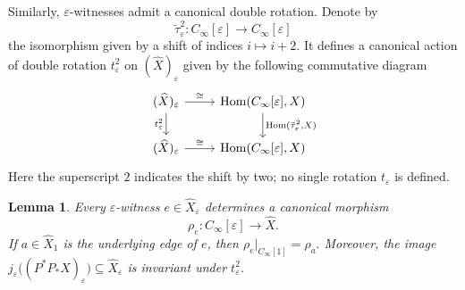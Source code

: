 \documentclass{article}
\theoremstyle{plain}
\newtheorem{lemma}[theorem]{Lemma}
\theoremstyle{definition}
\theoremstyle{remark}
\begin{document}
Similarly, \(\varepsilon\)-witnesses admit a canonical double rotation.
Denote by $$\tilde{\tau}^2_\varepsilon\colon C_\infty[\varepsilon]\rightarrow C_\infty[\varepsilon]$$ the isomorphism given by a shift of indices $i\mapsto i+2$.
It defines a canonical action of double rotation $t^2_\varepsilon$ on $(\widehat{X})_\varepsilon$ given by the following commutative diagram
\begin{equation}\label{diag:canonicalEpsRot}
    \begin{tikzcd}
        (\widehat{X})_\varepsilon\arrow[r,"\cong"]\arrow[d,"{t_\varepsilon^2}"']&\mathrm{Hom}(C_\infty[\varepsilon],X)\arrow[d,"{\mathrm{Hom}(\tilde{\tau}^2_\varepsilon,X)}"]\\
        (\widehat{X})_\varepsilon\arrow[r,"\cong"]&\mathrm{Hom}(C_\infty[\varepsilon],X)
    \end{tikzcd}
\end{equation}
Here the superscript $2$ indicates the shift by two; no single rotation $t_\varepsilon$ is defined.
\begin{lemma}\label{lem:canonicalOrbitsEps}
   Every \(\varepsilon\)-witness
    \(e\in\widehat X_\varepsilon\) determines a canonical morphism
    \[
        \rho_e\colon C_\infty[\varepsilon]\longrightarrow\widehat X.
    \]
    If \(a\in\widehat X_1\) is the underlying edge of \(e\), then
    \(
        \rho_e|_{C_\infty[1]}=\rho_a.
    \)
    Moreover, the image
\(
    j_\varepsilon\bigl((P^*P_*X)_\varepsilon\bigr)
    \subseteq\widehat X_\varepsilon
\)
is invariant under \(t_\varepsilon^2\).
\end{lemma}
\end{document}
